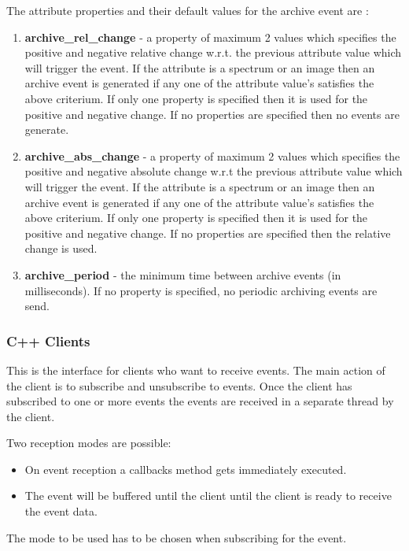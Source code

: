 The attribute properties and their default values for the \textquotedbl{}archive\textquotedbl{}
event are :
\begin{enumerate}
\item \textbf{archive\_rel\_change} - a property
of maximum 2 values which specifies the positive and negative relative
change w.r.t. the previous attribute value which will trigger the
event. If the attribute is a spectrum or an image then an archive
event is generated if any one of the attribute value's satisfies the
above criterium. If only one property is specified then it is used
for the positive and negative change. If no properties are specified
then no events are generate.
\item \textbf{archive\_abs\_change} - a property
of maximum 2 values which specifies the positive and negative absolute
change w.r.t the previous attribute value which will trigger the event.
If the attribute is a spectrum or an image then an archive event is
generated if any one of the attribute value's satisfies the above
criterium. If only one property is specified then it is used for the
positive and negative change. If no properties are specified then
the relative change is used.
\item \textbf{archive\_period} - the minimum time
between archive events (in milliseconds). If no property is specified,
no periodic archiving events are send.
\end{enumerate}

\subsubsection{C++ Clients}

This is the interface for clients who want to receive events.
The main action of the client is to subscribe and unsubscribe to events.
Once the client has subscribed to one or more events the events are
received in a separate thread by the client.

Two reception modes are possible:
\begin{itemize}
\item On event reception a callbacks method gets immediately executed.
\item The event will be buffered until the client until the client is ready
to receive the event data.
\end{itemize}
The mode to be used has to be chosen when subscribing for the event.

